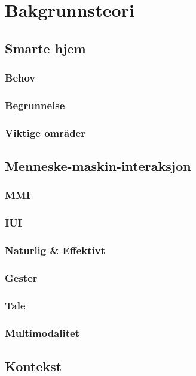 \section[Bakgrunnsteori]{Bakgrunnsteori}
\subsection{Smarte hjem}
\subsubsection*{Behov}
\subsubsection*{Begrunnelse}
\subsubsection*{Viktige områder}

\subsection{Menneske-maskin-interaksjon}
\subsubsection*{MMI}
\subsubsection*{IUI}
\subsubsection*{Naturlig \& Effektivt}
\subsubsection*{Gester}
\subsubsection*{Tale}
\subsubsection*{Multimodalitet}

\subsection{Kontekst}

